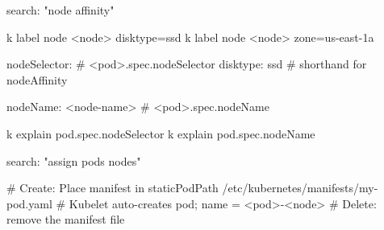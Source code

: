 \begin{tcbitemize}[
  raster columns=4, raster equal height=rows,
  blanker, cheat subtitle
]
\begin{tcbitemize}[
      raster columns=1, raster equal height=rows,
      blanker, cheat subtitle
    ]
        \begin{cheatcodebash}
        search: "node affinity"
        \end{cheatcodebash}


      \tcbitem
        \begin{cheatcodebash}
        k label node <node> disktype=ssd
        k label node <node> zone=us-east-1a
        \end{cheatcodebash}

        \begin{cheatcodebash}
        nodeSelector:          # <pod>.spec.nodeSelector
          disktype: ssd        # shorthand for nodeAffinity
        \end{cheatcodebash}

        \begin{cheatcodebashbold}
        nodeName: <node-name>  # <pod>.spec.nodeName
        \end{cheatcodebashbold}

        \begin{cheatcodebash}
        k explain pod.spec.nodeSelector
        k explain pod.spec.nodeName
        \end{cheatcodebash}

        \begin{cheatcodebash}
        search: "assign pods nodes"
        \end{cheatcodebash}

      \tcbitem

        \begin{cheatcodebashbold}
        # Create: Place manifest in staticPodPath
        /etc/kubernetes/manifests/my-pod.yaml
        # Kubelet auto-creates pod; name = <pod>-<node>
        # Delete: remove the manifest file
        \end{cheatcodebashbold}


\end{tcbitemize}
\end{tcbitemize}
